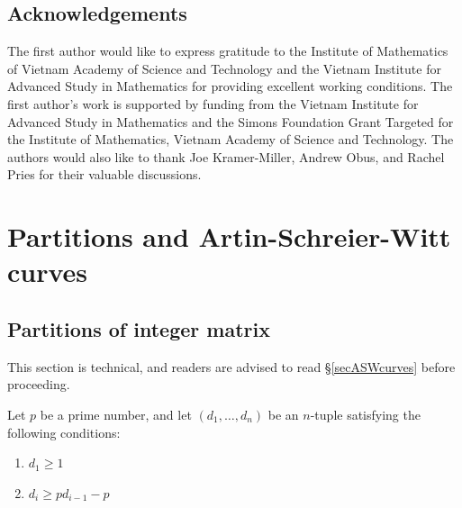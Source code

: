 \documentclass{compositio}
\newcommand{\mat}[1]{\todo[color=green]{MH: #1}}
\theoremstyle{remark}
\theoremstyle{remark}
\begin{document}
\subsection{Acknowledgements}
The first author would like to express gratitude to the Institute of Mathematics of Vietnam Academy of Science and Technology and the Vietnam Institute for Advanced Study in Mathematics for providing excellent working conditions. The first author's work is supported by funding from the Vietnam Institute for Advanced Study in Mathematics and the Simons Foundation Grant Targeted for the Institute of Mathematics, Vietnam Academy of Science and Technology. The authors would also like to thank Joe Kramer-Miller, Andrew Obus, and Rachel Pries for their valuable discussions.

\section{Partitions and Artin-Schreier-Witt curves}
\label{secpartionASW}

\subsection{Partitions of integer matrix}
\label{secpartitionmatrix}
This section is technical, and readers are advised to read \S \ref{secASWcurves} before proceeding.

Let $p$ be a prime number, and let $(d_1, \ldots, d_n)$ be an $n$-tuple 
satisfying the following conditions:
\begin{enumerate}[label*=\alph*)]
\item $d_1 \geq 1$
\item $d_i \geq pd_{i-1}-p$
\end{enumerate}
\end{document}
